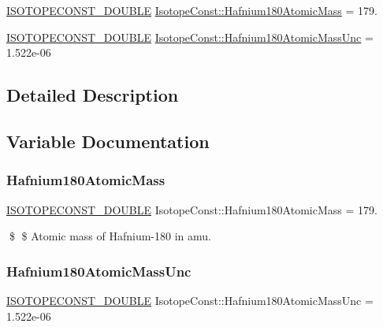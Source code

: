 \begin{DoxyCompactItemize}
\item 
\mbox{\hyperlink{group___isotope_const-_macros_ga8f45a7272ce02c0b4c65c44636ed719a}{I\+S\+O\+T\+O\+P\+E\+C\+O\+N\+S\+T\+\_\+\+D\+O\+U\+B\+LE}} \mbox{\hyperlink{group___isotope_const-_hafnium-_hf180_gae74748a55c23f010d68c6405dde03077}{Isotope\+Const\+::\+Hafnium180\+Atomic\+Mass}} = 179.
\item 
\mbox{\hyperlink{group___isotope_const-_macros_ga8f45a7272ce02c0b4c65c44636ed719a}{I\+S\+O\+T\+O\+P\+E\+C\+O\+N\+S\+T\+\_\+\+D\+O\+U\+B\+LE}} \mbox{\hyperlink{group___isotope_const-_hafnium-_hf180_gaa07f8a7bf38e0a72e6180a5acdcc40fd}{Isotope\+Const\+::\+Hafnium180\+Atomic\+Mass\+Unc}} = 1.\+522e-\/06
\end{DoxyCompactItemize}


\subsection{Detailed Description}


\subsection{Variable Documentation}
\mbox{\label{group___isotope_const-_hafnium-_hf180_gae74748a55c23f010d68c6405dde03077}} 
\subsubsection{\texorpdfstring{Hafnium180\+Atomic\+Mass}{Hafnium180AtomicMass}}
{\footnotesize\ttfamily \mbox{\hyperlink{group___isotope_const-_macros_ga8f45a7272ce02c0b4c65c44636ed719a}{I\+S\+O\+T\+O\+P\+E\+C\+O\+N\+S\+T\+\_\+\+D\+O\+U\+B\+LE}} Isotope\+Const\+::\+Hafnium180\+Atomic\+Mass = 179.}

\$ \$ Atomic mass of Hafnium-\/180 in amu. \mbox{\label{group___isotope_const-_hafnium-_hf180_gaa07f8a7bf38e0a72e6180a5acdcc40fd}} 
\subsubsection{\texorpdfstring{Hafnium180\+Atomic\+Mass\+Unc}{Hafnium180AtomicMassUnc}}
{\footnotesize\ttfamily \mbox{\hyperlink{group___isotope_const-_macros_ga8f45a7272ce02c0b4c65c44636ed719a}{I\+S\+O\+T\+O\+P\+E\+C\+O\+N\+S\+T\+\_\+\+D\+O\+U\+B\+LE}} Isotope\+Const\+::\+Hafnium180\+Atomic\+Mass\+Unc = 1.\+522e-\/06}

